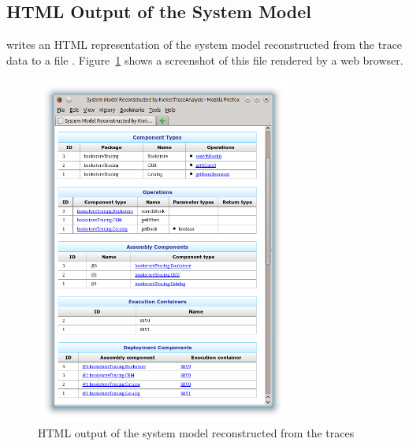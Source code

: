 \pagebreak

\subsection{HTML Output of the System Model}

\KiekerTraceAnalysis{} writes an HTML representation of the system model reconstructed %
from the trace data to a file . %
Figure~\ref{fig:appendix:traceAnalysisExample:htmlSystemModel} shows a screenshot %
of this file rendered by a web browser.

\enlargethispage{1.5cm}

\begin{figure}[h!]\centering
\includegraphics[width=0.75\textwidth]{images/system-entities-html-FFscrsh.png}
\caption{HTML output of the system model reconstructed from the traces}
\label{fig:appendix:traceAnalysisExample:htmlSystemModel}
\end{figure}

